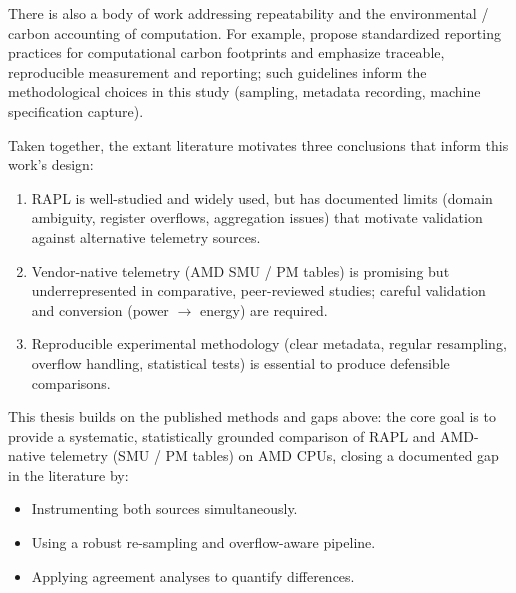 There is also a body of work addressing repeatability and the
environmental / carbon accounting of computation. For example,
\textcite{GreenAlgos} propose standardized reporting practices
for computational carbon footprints and emphasize traceable,
reproducible measurement and reporting; such guidelines inform the
methodological choices in this study (sampling, metadata recording,
machine specification capture).

Taken together, the extant literature motivates three conclusions that
inform this work's design:

\begin{enumerate}
  \item \gls{RAPL} is well-studied and widely used, but has documented limits
    (domain ambiguity, register overflows, aggregation issues) that
    motivate validation against alternative telemetry sources.
  \item Vendor-native telemetry (AMD \gls{SMU} / \gls{PM} tables) is promising but
    underrepresented in comparative, peer-reviewed studies; careful
    validation and conversion (power $\rightarrow$ energy) are required.
  \item Reproducible experimental methodology (clear metadata, regular
    resampling, overflow handling, statistical tests) is essential to
    produce defensible comparisons.
\end{enumerate}

This thesis builds on the published methods and gaps above: the core
goal is to provide a systematic, statistically grounded comparison of
\gls{RAPL} and AMD-native telemetry (\gls{SMU} / \gls{PM} tables) on AMD \gls{CPU}s,
closing a documented gap in the literature by:

\begin{itemize}
  \item Instrumenting both sources simultaneously.
  \item Using a robust re-sampling and overflow-aware pipeline.
  \item Applying agreement analyses to quantify differences.
\end{itemize}
